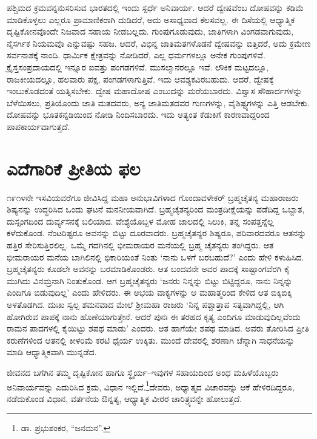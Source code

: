 ಪಶ್ಚಿಮದ ಕ್ರಮವನ್ನನುಸರಿಸುವ ಭಾರತದಲ್ಲಿ ಇಂದು ಸ್ಪರ್ಧೆ ಅನಿವಾರ್ಯ. ಆದರೆ ದ್ವೇಷವೆಂಬ ದೋಷವನ್ನು ಕಡಿಮೆ ಮಾಡಿಕೊಳ್ಳಲು ಎಲ್ಲರೂ ಪ್ರಾಮಾಣಿಕರಾಗಿ ದುಡಿದರೆ, ಅದು ಅಸಾಧ್ಯವಾದ ಕೆಲಸವಲ್ಲ. ಈ ದಿಸೆಯಲ್ಲಿ ಆಧ್ಯಾತ್ಮಿಕ ದೃಷ್ಟಿಕೋನವೊಂದೇ ನಿಜವಾದ ಸಹಾಯ ನೀಡಬಲ್ಲದು. ಗುಂಪುಗೂಡುವುದು, ಜಾತಿಗಳಾಗಿ ವಿಂಗಡವಾಗುವುದು, ನೈಸರ್ಗಿಕ ನಿಯಮವೊ ಎನ್ನುವಷ್ಟು ಸಹಜ. ಆದರೆ, ವಿಭಿನ್ನ ಜಾತಿಮತಗಳೊಡನೆ ದ್ವೇಷವನ್ನು ಬಿತ್ತಿದರೆ, ಅದು ಕ್ರಮೇಣ ಸರ್ವನಾಶಕ್ಕೆ ನಾಂದಿ. ಧಾರ್ಮಿಕ ಕ್ಷೇತ್ರವನ್ನು ನೋಡಿದರೆ, ಎಲ್ಲ ಧರ್ಮಗಳಲ್ಲೂ ಅನೇಕ ಗುಂಪುಗಳಿವೆ. ಕ್ರೈಸ್ತಸಂಪ್ರದಾಯದಲ್ಲಿ ಇನ್ನೂರ ಐವತ್ತು ಪಂಗಡಗಳಿವೆ. ಮುಸಲ್ಮಾನರಲ್ಲೂ ಇವೆ. ಲೌಕಿಕ ಮಟ್ಟದಲ್ಲೂ, ರಾಜಕೀಯದಲ್ಲೂ, ಹಲವಾರು ಪಕ್ಷ, ಪಂಗಡಗಳಾಗುತ್ತಿವೆ. ಇದು ಆವಶ್ಯಕವಿರಬಹುದು. ಆದರೆ, ದ್ವೇಷಕ್ಕೆ ಇಂಬುಕೊಡದಂತೆ ಯತ್ನಿಸಬೇಕು. ದ್ವೇಷ ಮಹಾದೋಷ ಎಂಬುದನ್ನು ಮರೆಯಬಾರದು. ವಿಶ್ವಾಸ ಸೌಹಾರ್ದಗಳನ್ನು ಬೆಳೆಯಿಸಲು, ಪ್ರತಿಯೊಂದು ಜಾತಿ ಮತದವರು, ಅನ್ಯ ಜಾತಿಮತದವರ ಗುಣಗಳನ್ನು, ವೈಶಿಷ್ಟ್ಯಗಳನ್ನು ಎತ್ತಿ ಆಡಬೇಕು. ದೋಷವನ್ನು ಭೂತಕನ್ನಡಿಯಿಂದ ನೋಡಿ ನಿಂದಿಸಬಾರದು. ಇದು ಅತ್ಯಂತ ಕೆಡುಕಿಗೆ ಕಾರಣವಾದ್ದರಿಂದ ಪಾಪಕಾರ್ಯವಾಗುತ್ತದೆ.


\section*{ಎದೆಗಾರಿಕೆ ಪ್ರೀತಿಯ ಫಲ}


೧೯೧೪ನೇ ಇಸವಿಯವರೆಗೂ ಜೀವಿಸಿದ್ದ ಮಹಾ ಅನುಭಾವಿಗಳಾದ ಗೊಂದಾವಳೇಕರ್ ಬ್ರಹ್ಮ\-ಚೈತನ್ಯ ಮಹಾರಾಜರು ಶಿಷ್ಯನನ್ನು ಉದ್ಧರಿಸಿದ ಒಂದು ಘಟನೆ ಮನನೀಯವಾಗಿದೆ. ಬ್ರಹ್ಮಚೈತನ್ಯರಿಂದ ಮಂತ್ರದೀಕ್ಷೆಯನ್ನು ಪಡೆದಿದ್ದ ಒಬ್ಬಾತ, ದುಸ್ಸಂಗದಿಂದ ದುರ್ವ್ಯಸನಕ್ಕೆ ಬಲಿಯಾದ. ವೇಶ್ಯೆಯೊಬ್ಬಳ ಮೋಹ ಜಾಲದಲ್ಲಿ ಸಿಲುಕಿ, ತನ್ನ ಸಂಪತ್ತನ್ನೆಲ್ಲ ಕಳೆದುಕೊಂಡ. ನೆಂಟರಿಷ್ಟರೂ ಅವನನ್ನು ಬಿಟ್ಟು ದೂರವಾದರು. ಬ್ರಹ್ಮಚೈತನ್ಯರ ಶಿಷ್ಯರೂ, ಪರಿವಾರದವರೂ ಆತನನ್ನು ಹತ್ತಿರ ಸೇರಿಸುತ್ತಿರಲಿಲ್ಲ. ಒಮ್ಮೆ ಗದಗಿನಲ್ಲಿ ಭೀಮರಾಯರ ಮನೆಯಲ್ಲಿ ಬ್ರಹ್ಮ ಚೈತನ್ಯರು ತಂಗಿದ್ದರು. ಆತ ಭೀಮರಾಯರ ಮನೆಯ ಬಾಗಿಲಿನಲ್ಲಿ ಭಿಕಾರಿಯಂತೆ ನಿಂತು ‘ನಾನು ಒಳಗೆ ಬರಬಹುದೆ?’ ಎಂದು ಹೇಳಿ ಕಳುಹಿಸಿದ. ಬ್ರಹ್ಮಚೈತನ್ಯರು ಕೂಡಲೇ ಅವನನ್ನು ಬರಮಾಡಿಕೊಂಡರು. ಆತ ಬಂದವನೇ ಅವರ ಪಾದಕ್ಕೆ ಸಾಷ್ಟಾಂಗವೆರಗಿ ಕೈ ಮುಗಿದು ವಿನಮ್ರನಾಗಿ ನಿಂತುಕೊಂಡ. ಆಗ ಬ್ರಹ್ಮಚೈತನ್ಯರು ‘ಜನರು ನಿನ್ನನ್ನು ಬಿಟ್ಟು ಬಿಟ್ಟಿದ್ದರೂ, ನಾನು ನಿನ್ನನ್ನು ಎಂದಿಗೂ ಬಿಡುವುದಿಲ್ಲ’ ಎಂದು ಹೇಳಿದರು. ಈ ಅಭಯ ವಾಕ್ಯಗಳನ್ನು ಆ ಮಹಾತ್ಮರಿಂದ ಕೇಳಿದ ಆತ ಬಿಕ್ಕಿಬಿಕ್ಕಿ ಅಳತೊಡಗಿದ. ದುಃಖ ಸ್ವಲ್ಪ ಶಮನವಾದ ಮೇಲೆ ಶ‍್ರೀಮಹಾ ರಾಜರು ‘ನಿನ್ನ ಪಶ್ಚಾತ್ತಾಪ ಸತ್ಯವಾಗಿದ್ದಲ್ಲಿ, ಆಗಿ ಹೋಗಿರುವ ಪಾಪಕ್ಕೆ ನಾನು ಹೊಣೆಯಾಗುತ್ತೇನೆ. ಆದರೆ ಪುನಃ ಈ ತರಹದ ಕೃತ್ಯ ಎಂದಿಗೂ ಮಾಡುವುದಿಲ್ಲವೆಂದು ರಾಮನ ಪಾದಗಳಲ್ಲಿ ಕೈಯಿಟ್ಟು ಶಪಥ ಮಾಡು’ ಎಂದರು. ಆತ ಹಾಗೆಯೇ ಶಪಥ ಮಾಡಿದ. ಅವರು ತೋರಿಸಿದ ಪ್ರೀತಿ ಕರುಣೆಗಳಿಂದ ಆತನಲ್ಲಿ ಕೀಳರಿಮೆ ಕರಟಿ ಧೈರ್ಯ ಉಕ್ಕಿತು. ಮುಂದೆ ದೇವರಲ್ಲಿ ಶರಣಾಗಿ ಚೆನ್ನಾಗಿ ಸಾಧನೆಯನ್ನು ಮಾಡಿ ಆಧ್ಯಾತ್ಮಿಕವಾಗಿ ಮುನ್ನಡೆದ.

ಜೀವನದ ಬಗೆಗಿನ ತಮ್ಮ ದೃಷ್ಟಿಕೋನ ಹಾಗೂ ಸ್ಥೈರ್ಯ–ಇವುಗಳ ಸಹಾಯದಿಂದ ಅಂಧ ಮಹಿಳೆಯೊಬ್ಬರು ಅನಿವಾರ್ಯವನ್ನು ಎದುರಿಸಿದ ಕ್ರಮ, ವಿಧಾನ ಇಲ್ಲಿದೆ.\footnote{ಡಾ. ಪ್ರಭುಶಂಕರ, “ಜನಮನ”.}ದೇವರು, ಅಧ್ಯಾತ್ಮದ ವಿಚಾರವನ್ನು ಆಕೆ ಹೇಳಿರದಿದ್ದರೂ, ನಡೆದುಕೊಂಡ ವಿಧಾನ, ವರ್ತನೆಯ ಔನ್ನತ್ಯ, ಆಧ್ಯಾತ್ಮಿಕ ವೀರರ ಚಾರಿತ್ರ್ಯವನ್ನೇ ಹೋಲುತ್ತದೆ.


